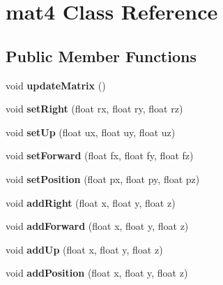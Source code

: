 \hypertarget{classmat4}{\section{mat4 Class Reference}
\label{classmat4}
}
\subsection*{Public Member Functions}
\begin{DoxyCompactItemize}
\item 
\hypertarget{classmat4_adbde50b3abf7dfbec1e19ba95e3a7fa1}{void {\bfseries update\+Matrix} ()}\label{classmat4_adbde50b3abf7dfbec1e19ba95e3a7fa1}

\item 
\hypertarget{classmat4_aa46cb42cc3583ddf52ba7fead0384cd8}{void {\bfseries set\+Right} (float rx, float ry, float rz)}\label{classmat4_aa46cb42cc3583ddf52ba7fead0384cd8}

\item 
\hypertarget{classmat4_aadaf94ea05c9251f373dd33e5909f349}{void {\bfseries set\+Up} (float ux, float uy, float uz)}\label{classmat4_aadaf94ea05c9251f373dd33e5909f349}

\item 
\hypertarget{classmat4_a31b89960b97fdb61af7de1234086d580}{void {\bfseries set\+Forward} (float fx, float fy, float fz)}\label{classmat4_a31b89960b97fdb61af7de1234086d580}

\item 
\hypertarget{classmat4_acc0c71fca3661981d996db8ad4cc179a}{void {\bfseries set\+Position} (float px, float py, float pz)}\label{classmat4_acc0c71fca3661981d996db8ad4cc179a}

\item 
\hypertarget{classmat4_a5bba33ee9413b58d6b9af878989dacd9}{void {\bfseries add\+Right} (float x, float y, float z)}\label{classmat4_a5bba33ee9413b58d6b9af878989dacd9}

\item 
\hypertarget{classmat4_abc97133e74b9b8b92d0f50b4c9cf06bf}{void {\bfseries add\+Forward} (float x, float y, float z)}\label{classmat4_abc97133e74b9b8b92d0f50b4c9cf06bf}

\item 
\hypertarget{classmat4_a8d25addb2050aad961252acf3735bf2d}{void {\bfseries add\+Up} (float x, float y, float z)}\label{classmat4_a8d25addb2050aad961252acf3735bf2d}

\item 
\hypertarget{classmat4_ab3c7dfceeca82edfaa709ed2eeabe64d}{void {\bfseries add\+Position} (float x, float y, float z)}\label{classmat4_ab3c7dfceeca82edfaa709ed2eeabe64d}


\end{DoxyCompactItemize}
